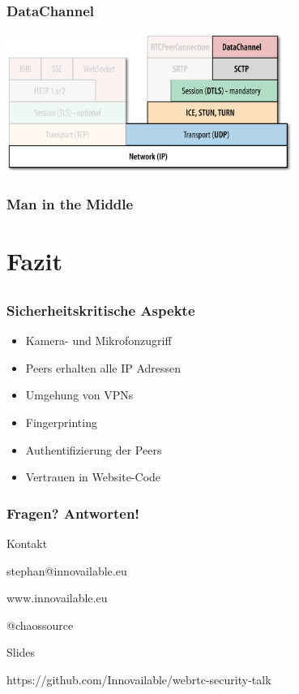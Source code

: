 \documentclass[12pt]{beamer}
\begin{document}
\begin{frame}
  \frametitle{DataChannel}
  \centerline{\includegraphics[width=0.7\textwidth]{img/stack_oreilly_datachannels.png}}
\end{frame}

\begin{frame}
  \frametitle{Man in the Middle}
  \centerline{}
\end{frame}


\section{Fazit}
\subsection{}

\begin{frame}
  \frametitle{Sicherheitskritische Aspekte}
  \begin{itemize}
    \item Kamera- und Mikrofonzugriff
    \item Peers erhalten alle IP Adressen
    \item Umgehung von VPNs
    \item Fingerprinting
    \item Authentifizierung der Peers
    \item Vertrauen in Website-Code
  \end{itemize}
\end{frame}

\begin{frame}
  \frametitle{Fragen? Antworten!}

  \centerline{\scriptsize{Kontakt}}
  \centerline{stephan@innovailable.eu}
  \centerline{www.innovailable.eu}
  \centerline{@chaossource}

  \vspace{0.2in}

  \centerline{\scriptsize{Slides}}
  \centerline{https://github.com/Innovailable/webrtc-security-talk}
\end{frame}
\end{document}
